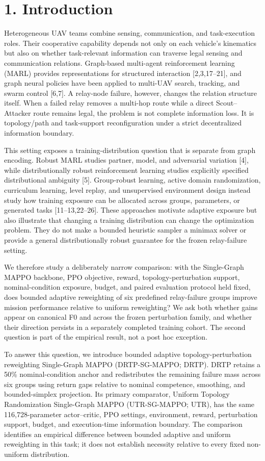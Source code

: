 \section{1. Introduction}

Heterogeneous UAV teams combine sensing, communication, and task-execution roles. Their cooperative capability depends not only on each vehicle's kinematics but also on whether task-relevant information can traverse legal sensing and communication relations. Graph-based multi-agent reinforcement learning (MARL) provides representations for structured interaction [2,3,17--21], and graph neural policies have been applied to multi-UAV search, tracking, and swarm control [6,7]. A relay-node failure, however, changes the relation structure itself. When a failed relay removes a multi-hop route while a direct Scout--Attacker route remains legal, the problem is not complete information loss. It is topology/path and task-support reconfiguration under a strict decentralized information boundary.

This setting exposes a training-distribution question that is separate from graph encoding. Robust MARL studies partner, model, and adversarial variation [4], while distributionally robust reinforcement learning studies explicitly specified distributional ambiguity [5]. Group-robust learning, active domain randomization, curriculum learning, level replay, and unsupervised environment design instead study how training exposure can be allocated across groups, parameters, or generated tasks [11--13,22--26]. These approaches motivate adaptive exposure but also illustrate that changing a training distribution can change the optimization problem. They do not make a bounded heuristic sampler a minimax solver or provide a general distributionally robust guarantee for the frozen relay-failure setting.

We therefore study a deliberately narrow comparison: with the Single-Graph MAPPO backbone, PPO objective, reward, topology-perturbation support, nominal-condition exposure, budget, and paired evaluation protocol held fixed, does bounded adaptive reweighting of six predefined relay-failure groups improve mission performance relative to uniform reweighting? We ask both whether gains appear on canonical F0 and across the frozen perturbation family, and whether their direction persists in a separately completed training cohort. The second question is part of the empirical result, not a post hoc exception.

To answer this question, we introduce bounded adaptive topology-perturbation reweighting Single-Graph MAPPO (DRTP-SG-MAPPO; DRTP). DRTP retains a 50\% nominal-condition anchor and redistributes the remaining failure mass across six groups using return gaps relative to nominal competence, smoothing, and bounded-simplex projection. Its primary comparator, Uniform Topology Randomization Single-Graph MAPPO (UTR-SG-MAPPO; UTR), has the same 116,728-parameter actor--critic, PPO settings, environment, reward, perturbation support, budget, and execution-time information boundary. The comparison identifies an empirical difference between bounded adaptive and uniform reweighting in this task; it does not establish necessity relative to every fixed non-uniform distribution.

